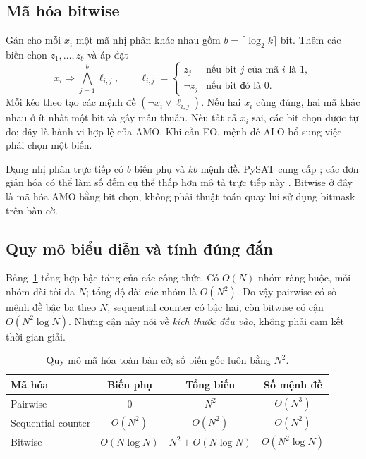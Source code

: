 \documentclass[a4paper,fleqn]{cas-sc}
\newcommand{\code}[1]{\texttt{\detokenize{#1}}}
\begin{document}
\subsection{Mã hóa bitwise}
Gán cho mỗi $x_i$ một mã nhị phân khác nhau gồm $b=\lceil\log_2k\rceil$ bit. Thêm các biến chọn $z_1,\ldots,z_b$ và áp đặt
\begin{equation}\label{eq:bitwise}
 x_i\Rightarrow\bigwedge_{j=1}^{b}\ell_{i,j},\qquad
 \ell_{i,j}=\begin{cases}z_j&\text{nếu bit }j\text{ của mã }i\text{ là }1,\\
 \neg z_j&\text{nếu bit đó là }0.\end{cases}
\end{equation}
Mỗi kéo theo tạo các mệnh đề $(\neg x_i\lor\ell_{i,j})$. Nếu hai $x_i$ cùng đúng, hai mã khác nhau ở ít nhất một bit và gây mâu thuẫn. Nếu tất cả $x_i$ sai, các bit chọn được tự do; đây là hành vi hợp lệ của AMO. Khi cần EO, mệnh đề ALO bổ sung việc phải chọn một biến.

Dạng nhị phân trực tiếp có $b$ biến phụ và $kb$ mệnh đề. PySAT cung cấp \code{EncType.bitwise}; các đơn giản hóa có thể làm số đếm cụ thể thấp hơn mô tả trực tiếp này \citep{pysatcard}. Bitwise ở đây là mã hóa AMO bằng bit chọn, không phải thuật toán quay lui sử dụng bitmask trên bàn cờ.

\subsection{Quy mô biểu diễn và tính đúng đắn}
Bảng~\ref{tab:asymptotic} tổng hợp bậc tăng của các công thức. Có $O(N)$ nhóm ràng buộc, mỗi nhóm dài tối đa $N$; tổng độ dài các nhóm là $O(N^2)$. Do vậy pairwise có số mệnh đề bậc ba theo $N$, sequential counter có bậc hai, còn bitwise có cận $O(N^2\log N)$. Những cận này nói về \emph{kích thước đầu vào}, không phải cam kết thời gian giải.

\begin{table}[htbp]
\caption{Quy mô mã hóa toàn bàn cờ; số biến gốc luôn bằng $N^2$.}\label{tab:asymptotic}
\centering
\begin{tabular}{lccc}
\toprule
Mã hóa & Biến phụ & Tổng biến & Số mệnh đề\\
\midrule
Pairwise & $0$ & $N^2$ & $\Theta(N^3)$\\
Sequential counter & $O(N^2)$ & $O(N^2)$ & $O(N^2)$\\
Bitwise & $O(N\log N)$ & $N^2+O(N\log N)$ & $O(N^2\log N)$\\
\bottomrule
\end{tabular}
\end{table}
\end{document}
